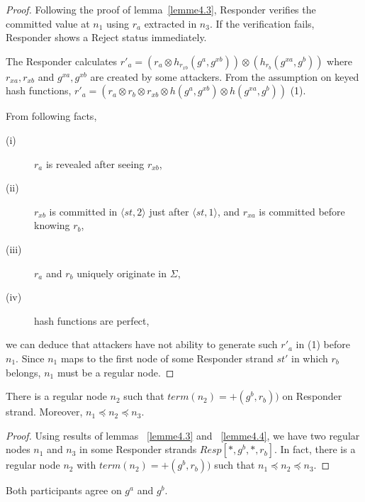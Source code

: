 \begin{proof}
Following the proof of lemma~\ref{lemme4.3}, Responder verifies the committed value at $n_1$ using $r_a$ extracted in $n_3$. If the verification fails, Responder shows a Reject status immediately. 

The Responder calculates $r'_{a} = (r_a \otimes h_{r_{xb}}(g^a,g^{xb})) \otimes (h_{r_b}(g^{xa},g^b))$ where $r_{xa},r_{xb}$ and $g^{xa},g^{xb}$ are created by some attackers. 
From the assumption on keyed hash functions, $r'_{a} = (r_a \otimes r_b \otimes r_{xb} \otimes h(g^a,g^{xb}) \otimes h(g^{xa},g^b))$ (1).

From following facts,
\begin{description} 
 \item [(i)] $r_a$ is revealed after seeing $r_{xb}$, 
 \item [(ii)] $r_{xb}$ is committed in $\langle st,2 \rangle$ just after $\langle st,1 \rangle$, and $r_{xa}$ is committed before knowing $r_b$, 
 \item[(iii)] $r_a$ and $r_b$ uniquely originate in $\Sigma$, 
 \item [(iv)] hash functions are perfect,
\end{description}
we can deduce that attackers have not ability to generate such $r'_{a}$ in (1) before $n_1$. 
Since $n_1$ maps to the first node of some Responder strand $st'$ in which $r_b$ belongs, $n_1$ must be a regular node. 
\end{proof}

\begin{Lemma}\label{lemme4.5}
There is a regular node $n_2$ such that $term(n_2)= + (g^b,r_b))$ on Responder strand. Moreover, $n_1 \preceq n_2 \preceq n_3$.
\end{Lemma}

\begin{proof}
Using results of lemmas ~\ref{lemme4.3} and ~\ref{lemme4.4}, we have two regular nodes $n_1$ and $n_3$ in some Responder strands $Resp[*,g^b,*,r_b]$. In fact, there is a regular node $n_2$ with $term(n_2)= + (g^b,r_b))$ such that $n_1 \preceq n_2 \preceq n_3$. 
\end{proof}

\begin{Lemma}\label{lemme4.6}
Both participants agree on $g^a$ and $g^b$. 
\end{Lemma}

